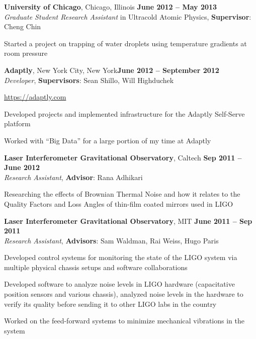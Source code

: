 \documentclass[margin,line]{resume}
\begin{document}
\begin{resume}
\textbf{University of Chicago}, Chicago, Illinois  \hfill \textbf{June 2012 -- May 2013}\\
\textsl{Graduate Student Research Assistant} in Ultracold Atomic Physics, \textbf{Supervisor}: Cheng Chin
\begin{list2}
  \item Started a project on trapping of water droplets using temperature gradients at room pressure
\end{list2}

\textbf{Adaptly}, New York City, New York\hfill \textbf{June 2012 -- September 2012}\\
\textsl{Developer}, \textbf{Supervisors}: Sean Shillo, Will Highduchek
\begin{list2}
  \item \url{https://adaptly.com}
  \item Developed projects and implemented infrastructure for the Adaptly Self-Serve platform
  \item Worked with ``Big Data'' for a large portion of my time at Adaptly
\end{list2}


\textbf{Laser Interferometer Gravitational Observatory}, Caltech \hfill \textbf{Sep 2011 -- June 2012}\\
\textsl{Research Assistant}, \textbf{Advisor}: Rana Adhikari
\begin{list2}
  \item Researching the effects of Brownian Thermal Noise and how it relates to the Quality Factors and Loss Angles of thin-film coated mirrors used in LIGO
\end{list2}

\textbf{Laser Interferometer Gravitational Observatory}, MIT \hfill \textbf{June 2011 -- Sep 2011}\\
\textsl{Research Assistant}, \textbf{Advisors}: Sam Waldman, Rai Weiss, Hugo Paris
\begin{list2}
  \item Developed control systems for monitoring the state of the LIGO system via multiple physical chassis setups and software collaborations
  \item Developed software to analyze noise levels in LIGO hardware (capacitative position sensors and various chassis), analyzed noise levels in the hardware to verify its quality before sending it to other LIGO labs in the country
  \item Worked on the feed-forward systems to minimize mechanical vibrations in the system
\end{list2}


\end{resume}
\end{document}
